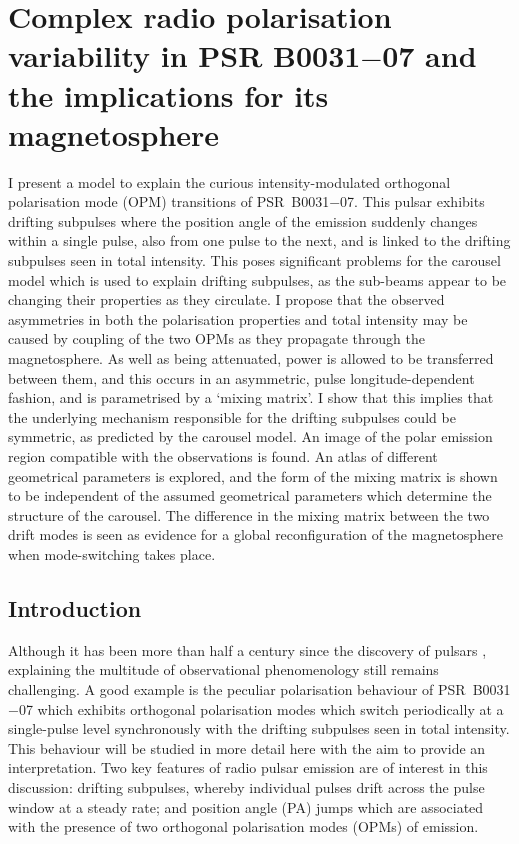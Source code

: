 \chapter[Complex pulsar polarisation and its implications]{Complex radio polarisation variability in PSR B0031$-$07 and the implications for its magnetosphere}
\label{chapt: B0031}

I present a model to explain the curious intensity-modulated orthogonal polarisation mode (OPM) transitions of PSR~B0031$-$07. This pulsar exhibits drifting subpulses where the position angle of the emission suddenly changes within a single pulse, also from one pulse to the next, and is linked to the drifting subpulses seen in total intensity. This poses significant problems for the carousel model which is used to explain drifting subpulses, as the sub-beams appear to be changing their properties as they circulate. I propose that the observed asymmetries in both the polarisation properties and total intensity may be caused by coupling of the two OPMs as they propagate through the magnetosphere. As well as being attenuated, power is allowed to be transferred between them, and this occurs in an asymmetric, pulse longitude-dependent fashion, and is parametrised by a `mixing matrix'. I show that this implies that the underlying mechanism responsible for the drifting subpulses could be symmetric, as predicted by the carousel model. An image of the polar emission region compatible with the observations is found. An atlas of different geometrical parameters is explored, and the form of the mixing matrix is shown to be independent of the assumed geometrical parameters which determine the structure of the carousel. The difference in the mixing matrix between the two drift modes is seen as evidence for a global reconfiguration of the magnetosphere when mode-switching takes place.

\section{Introduction}
\label{sec: B0031 - introduction}

Although it has been more than half a century since the discovery of pulsars \citep{HBP+1968}, explaining the multitude of observational phenomenology still remains challenging. A good example is the peculiar polarisation behaviour of PSR~B0031$-$07 \citep{IWJ+2020} which exhibits orthogonal polarisation modes which switch periodically at a single-pulse level synchronously with the drifting subpulses seen in total intensity. This behaviour will be studied in more detail here with the aim to provide an interpretation. Two key features of radio pulsar emission are of interest in this discussion: drifting subpulses, whereby individual pulses drift across the pulse window at a steady rate; and position angle (PA) jumps which are associated with the presence of two orthogonal polarisation modes (OPMs) of emission.

